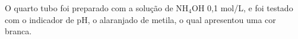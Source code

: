         \indent O quarto tubo foi preparado com a solução de NH$_4$OH 0,1 mol/L, e foi testado com o indicador de pH, o alaranjado de metila, o qual apresentou uma cor branca.

        \begin{figure}[h]
            \centering
            \qquad

\end{figure}
